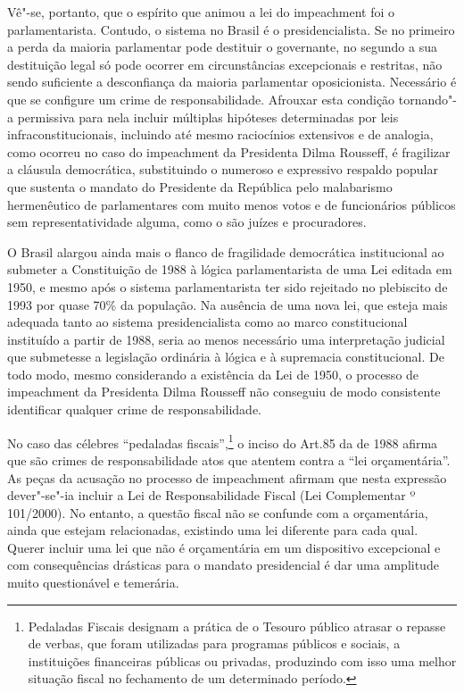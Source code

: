Vê"-se, portanto, que o espírito que animou a lei do impeachment foi o
parlamentarista. Contudo, o sistema no Brasil é o presidencialista. Se
no primeiro a perda da maioria parlamentar pode destituir o governante,
no segundo a sua destituição legal só pode ocorrer em circunstâncias
excepcionais e restritas, não sendo suficiente a desconfiança da maioria
parlamentar oposicionista. Necessário é que se configure um crime de
responsabilidade. Afrouxar esta condição tornando"-a permissiva para nela
incluir múltiplas hipóteses determinadas por leis infraconstitucionais,
incluindo até mesmo raciocínios extensivos e de analogia, como ocorreu
no caso do impeachment da Presidenta Dilma Rousseff, é fragilizar a
cláusula democrática, substituindo o numeroso e expressivo respaldo
popular que sustenta o mandato do Presidente da República pelo
malabarismo hermenêutico de parlamentares com muito menos votos e de
funcionários públicos sem representatividade alguma, como o são juízes e
procuradores.

O Brasil alargou ainda mais o flanco de fragilidade democrática
institucional ao submeter a Constituição de 1988 à lógica
parlamentarista de uma Lei editada em 1950, e mesmo após o sistema
parlamentarista ter sido rejeitado no plebiscito de 1993 por quase 70\%
da população. Na ausência de uma nova lei, que esteja mais adequada
tanto ao sistema presidencialista como ao marco constitucional
instituído a partir de 1988, seria ao menos necessário uma interpretação
judicial que submetesse a legislação ordinária à lógica e à supremacia
constitucional. De todo modo, mesmo considerando a existência da Lei de
1950, o processo de impeachment da Presidenta Dilma Rousseff não
conseguiu de modo consistente identificar qualquer crime de
responsabilidade.

No caso das célebres ``pedaladas fiscais'',\footnote{Pedaladas Fiscais
  designam a prática de o Tesouro público atrasar o repasse de verbas,
  que foram utilizadas para programas públicos e sociais, a instituições
  financeiras públicas ou privadas, produzindo com isso uma melhor
  situação fiscal no fechamento de um determinado período.} o inciso 
do Art.85 da  de 1988 afirma que são crimes de responsabilidade atos
que atentem contra a ``lei orçamentária''. As peças da acusação no
processo de impeachment afirmam que nesta expressão dever"-se"-ia incluir
a Lei de Responsabilidade Fiscal (Lei Complementar º 101/2000). No
entanto, a questão fiscal não se confunde com a orçamentária, ainda que
estejam relacionadas, existindo uma lei diferente para cada qual. Querer
incluir uma lei que não é orçamentária em um dispositivo excepcional e
com consequências drásticas para o mandato presidencial é dar uma
amplitude muito questionável e temerária.

